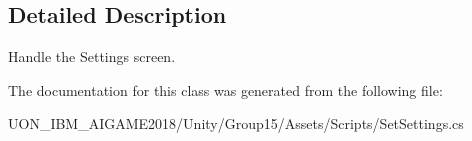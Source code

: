 \subsection{Detailed Description}
Handle the Settings screen. 

The documentation for this class was generated from the following file\+:\begin{DoxyCompactItemize}
\item 
U\+O\+N\+\_\+\+I\+B\+M\+\_\+\+A\+I\+G\+A\+M\+E2018/\+Unity/\+Group15/\+Assets/\+Scripts/Set\+Settings.\+cs\end{DoxyCompactItemize}
